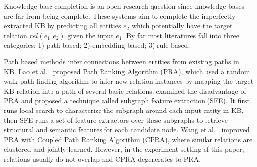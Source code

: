 Knowledge base completion is an open research question 
\cite{gardner2014incorporating,lao2011random,gardner2015efficient}
since knowledge bases are far from being complete.
These systems aim to complete the imperfectly extracted KB by 
predicting all entities $e_2$
which potentially have the target relation $rel(e_1, e_2)$ given the input $e_1$. 
By far most literatures fall into three categories: 1) path based; 2) embedding based; 3) rule based.

Path based methods infer connections between entities from existing paths in KB. Lao et al.~\shortcite{} proposed Path Ranking Algorithm (PRA), which used a random walk path finding algorithm to infer new relation instances by mapping the target KB relation into a path of several basic relations. \cite{} examined the disadvantage of PRA and proposed a technique called subgraph feature extraction (SFE). It first runs local search to characterize the subgraph around each input entity in KB, then SFE runs a set of feature extractors over these subgraphs to retrieve structural and semantic features for each candidate node. Wang et al.~\shortcite{} improved PRA with Coupled Path Ranking Algorithm (CPRA), where similar relations are clustered and jointly learned. However, in the experiment setting of this paper, relations usually do not overlap and CPRA degenerates to PRA.

